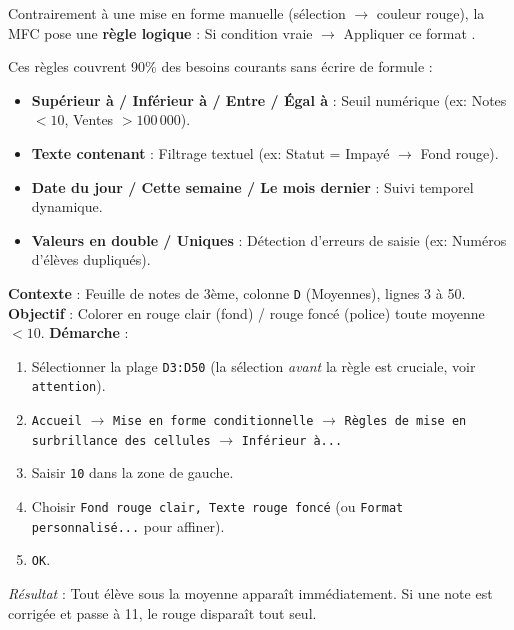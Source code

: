 \documentclass[11pt]{article}
\begin{document}
Contrairement à une mise en forme manuelle (sélection $\to$ couleur rouge), la MFC pose une \textbf{règle logique} : \og Si condition vraie $\to$ Appliquer ce format \fg.

\begin{propriete}
Ces règles couvrent 90\% des besoins courants sans écrire de formule :
\begin{itemize}
    \item \textbf{Supérieur à / Inférieur à / Entre / Égal à} : Seuil numérique (ex: Notes $< 10$, Ventes $> 100\,000$).
    \item \textbf{Texte contenant} : Filtrage textuel (ex: Statut = \og Impayé \fg $\to$ Fond rouge).
    \item \textbf{Date du jour / Cette semaine / Le mois dernier} : Suivi temporel dynamique.
    \item \textbf{Valeurs en double / Uniques} : Détection d'erreurs de saisie (ex: Numéros d'élèves dupliqués).
\end{itemize}
\end{propriete}

\begin{exemplebox}
\textbf{Contexte} : Feuille de notes de 3ème, colonne \texttt{D} (Moyennes), lignes 3 à 50.
\textbf{Objectif} : Colorer en rouge clair (fond) / rouge foncé (police) toute moyenne $< 10$.
\textbf{Démarche} :
\begin{enumerate}
    \item Sélectionner la plage \texttt{D3:D50} (la sélection \emph{avant} la règle est cruciale, voir \texttt{attention}).
    \item \texttt{Accueil} $\to$ \texttt{Mise en forme conditionnelle} $\to$ \texttt{Règles de mise en surbrillance des cellules} $\to$ \texttt{Inférieur à...}
    \item Saisir \texttt{10} dans la zone de gauche.
    \item Choisir \texttt{Fond rouge clair, Texte rouge foncé} (ou \texttt{Format personnalisé...} pour affiner).
    \item \texttt{OK}.
\end{enumerate}
\emph{Résultat} : Tout élève sous la moyenne apparaît immédiatement. Si une note est corrigée et passe à 11, le rouge disparaît tout seul.
\end{exemplebox}
\end{document}
